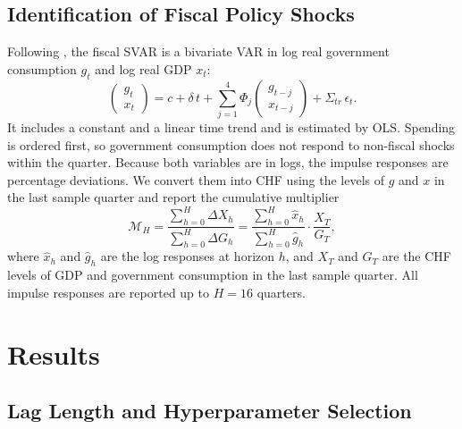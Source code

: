 \documentclass[11pt]{article}
\begin{document}
\subsection{Identification of Fiscal Policy Shocks}

Following \citet{blanchardperotti2002}, the fiscal SVAR is a bivariate VAR in log real government consumption $g_t$ and log real GDP $x_t$:
\begin{equation}
  \begin{pmatrix} g_t \\ x_t \end{pmatrix} = c + \delta\, t + \sum_{j=1}^{4} \Phi_j \begin{pmatrix} g_{t-j} \\ x_{t-j} \end{pmatrix} + \Sigma_{tr}\, \epsilon_t.
\end{equation}
It includes a constant and a linear time trend and is estimated by OLS. Spending is ordered first, so government consumption does not respond to non-fiscal shocks within the quarter. Because both variables are in logs, the impulse responses are percentage deviations. We convert them into CHF using the levels of $g$ and $x$ in the last sample quarter and report the cumulative multiplier
\begin{equation}
  \mathcal{M}_H = \frac{\sum_{h=0}^{H} \Delta X_h}{\sum_{h=0}^{H} \Delta G_h} = \frac{\sum_{h=0}^{H} \hat x_h}{\sum_{h=0}^{H} \hat g_h} \cdot \frac{X_T}{G_T},
\end{equation}
where $\hat x_h$ and $\hat g_h$ are the log responses at horizon $h$, and $X_T$ and $G_T$ are the CHF levels of GDP and government consumption in the last sample quarter. All impulse responses are reported up to $H = 16$ quarters.

\section{Results}
\label{sec:results}

\subsection{Lag Length and Hyperparameter Selection}
\end{document}
